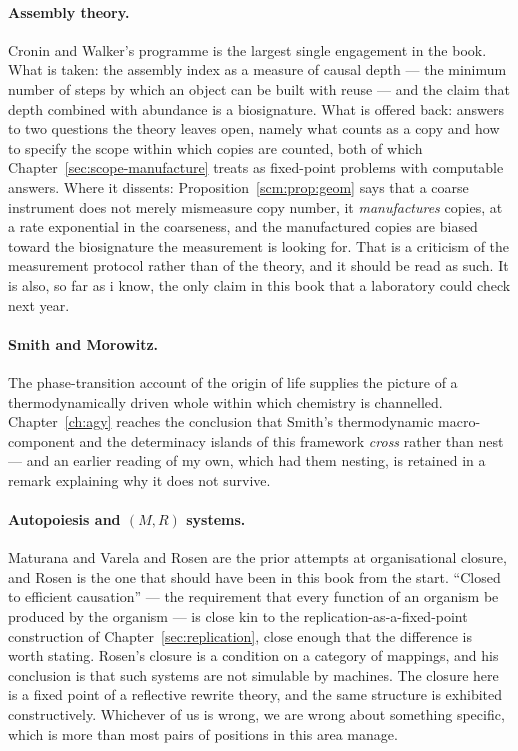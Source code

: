 \paragraph{Assembly theory.}
Cronin and Walker's programme \cite{cronin2021,walker2023} is the
largest single engagement in the book.
What is taken: the assembly index as a measure of causal depth ---
the minimum number of steps by which an object can be built with
reuse --- and the claim that depth combined with abundance is a
biosignature.
What is offered back: answers to two questions the theory leaves
open, namely what counts as a copy and how to specify the scope
within which copies are counted, both of which
Chapter~\ref{sec:scope-manufacture} treats as fixed-point problems
with computable answers.
Where it dissents: Proposition~\ref{scm:prop:geom} says that a
coarse instrument does not merely mismeasure copy number, it
\emph{manufactures} copies, at a rate exponential in the coarseness,
and the manufactured copies are biased toward the biosignature the
measurement is looking for.
That is a criticism of the measurement protocol rather than of the
theory, and it should be read as such.
It is also, so far as i know, the only claim in this book that a
laboratory could check next year.

\paragraph{Smith and Morowitz.}
The phase-transition account of the origin of life
\cite{SmithMorowitz} supplies the picture of a thermodynamically
driven whole within which chemistry is channelled.
Chapter~\ref{ch:agy} reaches the conclusion that Smith's
thermodynamic macro-component and the determinacy islands of this
framework \emph{cross} rather than nest --- and an earlier reading
of my own, which had them nesting, is retained in a remark
explaining why it does not survive.

\paragraph{Autopoiesis and $(M,R)$ systems.}
Maturana and Varela \cite{maturanavarela1980} and Rosen
\cite{rosen1991} are the prior attempts at organisational closure,
and Rosen is the one that should have been in this book from the
start.
``Closed to efficient causation'' --- the requirement that every
function of an organism be produced by the organism --- is close
kin to the replication-as-a-fixed-point construction of
Chapter~\ref{sec:replication}, close enough that the difference is
worth stating.
Rosen's closure is a condition on a category of mappings, and his
conclusion is that such systems are not simulable by machines.
The closure here is a fixed point of a reflective rewrite theory,
and the same structure is exhibited constructively.
Whichever of us is wrong, we are wrong about something specific,
which is more than most pairs of positions in this area manage.


